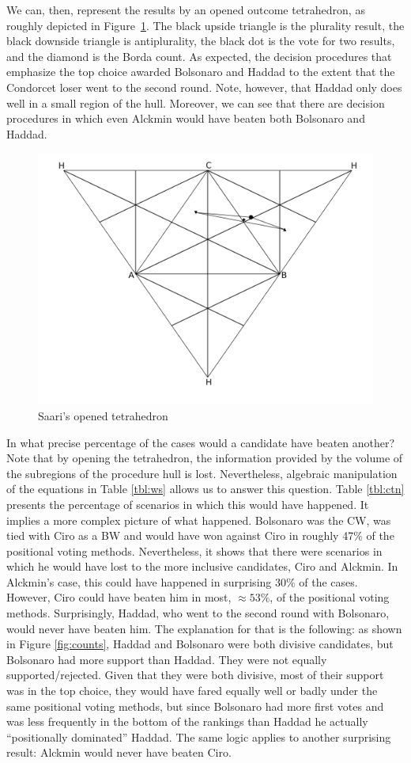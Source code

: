 \documentclass[hidelinks,11pt]{article} \usepackage[utf8]{inputenc}
\begin{document}


We can, then, represent the results by an opened outcome tetrahedron, as roughly
depicted in Figure~\ref{fig:ot}. The black upside triangle is the plurality
result, the black downside triangle is antiplurality, the black dot is the vote
for two results, and the diamond is the Borda count. As expected, the decision
procedures that emphasize the top choice awarded Bolsonaro and Haddad to the
extent that the Condorcet loser went to the second round. Note, however, that
Haddad only does well in a small region of the hull. Moreover, we can see that
there are decision procedures in which even Alckmin would have beaten both
Bolsonaro and Haddad.

\begin{figure}[!h] \centering \includegraphics[width=0.5\columnwidth,
height=0.3\textheight]{./images/opened_tetrahedron1.png}
 \caption{Saari's opened tetrahedron }
 \label{fig:ot}
\end{figure}

In what precise percentage of the cases would a candidate have beaten another?
Note that by opening the tetrahedron, the information provided by the volume of
the subregions of the procedure hull is lost. Nevertheless, algebraic
manipulation of the equations in Table \ref{tbl:ws} allows us to answer this
question. Table \ref{tbl:ctn} presents the percentage of scenarios in which this
would have happened. It implies a more complex picture of what happened.
Bolsonaro was the CW, was tied with Ciro as a BW and would have won against Ciro
in roughly 47\(\%\) of the positional voting methods. Nevertheless, it shows
that there were scenarios in which he would have lost to the more inclusive
candidates, Ciro and Alckmin. In Alckmin's case, this could have happened in
surprising \(30\%\) of the cases. However, Ciro could have beaten him in most,
\(\approx 53\%\), of the positional voting methods. Surprisingly, Haddad, who
went to the second round with Bolsonaro, would never have beaten him. The
explanation for that is the following: as shown in Figure \ref{fig:counts},
Haddad and Bolsonaro were both divisive candidates, but Bolsonaro had more
support than Haddad. They were not equally supported/rejected. Given that they
were both divisive, most of their support was in the top choice, they would have
fared equally well or badly under the same positional voting methods, but since
Bolsonaro had more first votes and was less frequently in the bottom of the
rankings than Haddad he actually ``positionally dominated'' Haddad. The same
logic applies to another surprising result: Alckmin would never have beaten
Ciro.
\end{document}
